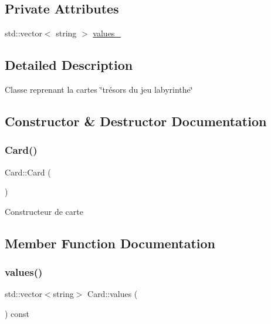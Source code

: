 \subsection*{Private Attributes}
\begin{DoxyCompactItemize}
\item 
std\+::vector$<$ string $>$ \mbox{\hyperlink{class_card_a12441d0811ac375535606c4cb626cd21}{values\+\_\+}}
\end{DoxyCompactItemize}


\subsection{Detailed Description}
Classe reprenant la cartes \char`\"{}trésors du jeu labyrinthe\char`\"{} 

\subsection{Constructor \& Destructor Documentation}
\mbox{\label{class_card_a783f5854cbe8c183ee3d4414c01472c0}} 
\subsubsection{\texorpdfstring{Card()}{Card()}}
{\footnotesize\ttfamily Card\+::\+Card (\begin{DoxyParamCaption}{ }\end{DoxyParamCaption})\hspace{0.3cm}{\ttfamily [inline]}}

Constructeur de carte 

\subsection{Member Function Documentation}
\mbox{\label{class_card_ac87b724afb93764edd8900170ced32bc}} 
\subsubsection{\texorpdfstring{values()}{values()}}
{\footnotesize\ttfamily std\+::vector$<$string$>$ Card\+::values (\begin{DoxyParamCaption}{ }\end{DoxyParamCaption}) const\hspace{0.3cm}{\ttfamily [inline]}}

